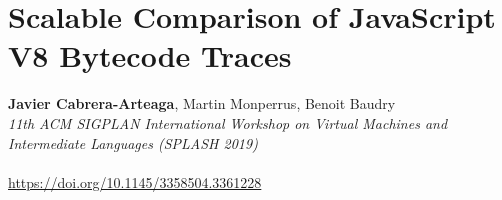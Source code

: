   
      {} %
      {} %
    
\chapter{Scalable Comparison of JavaScript V8 Bytecode Traces}

\textbf{Javier Cabrera-Arteaga}, Martin Monperrus, Benoit Baudry\\
\emph{11th ACM SIGPLAN International Workshop on Virtual Machines and Intermediate Languages (SPLASH 2019)}\\\\
\url{https://doi.org/10.1145/3358504.3361228}\\


%
    {} %
    {} %
    